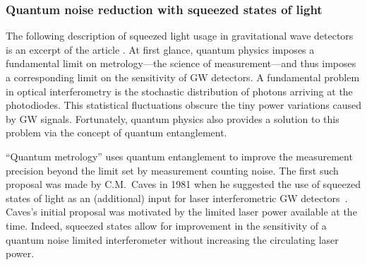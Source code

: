\FloatBarrier
\subsubsection{Quantum noise reduction with squeezed states of light}\label{subsec:QNRsqz}
The following description of squeezed light usage in gravitational wave detectors is an excerpt of the article \cite{SqueezingSchnabel2010}. 
At first glance, quantum physics imposes a fundamental limit on metrology---the science of measurement---and thus imposes a corresponding limit on the sensitivity of GW detectors.  A fundamental problem in optical interferometry is
the stochastic distribution of photons arriving at the photodiodes.  This statistical fluctuations obscure the tiny power variations caused by GW signals. Fortunately, quantum physics also provides a solution to this problem via the concept of quantum entanglement.

``Quantum metrology'' uses quantum entanglement to improve the measurement precision beyond the limit set by measurement counting noise. The first such proposal was made by C.M.\ Caves in 1981 when he suggested the use of squeezed states of light as an (additional) input for laser interferometric GW detectors~\cite{Caves1981}. Caves's initial proposal was motivated by the limited laser power available at the time. Indeed, squeezed states allow for improvement in the sensitivity of a quantum noise limited interferometer without increasing the circulating laser power. %

